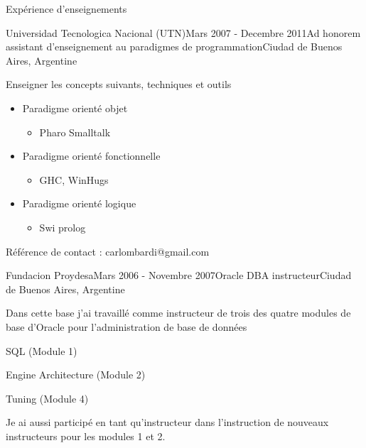 \documentclass{resume} %
\begin{document}
\begin{rSection}{Exp\'{e}rience d'enseignements}
\begin{rSubsection}{Universidad Tecnologica Nacional (UTN)}{Mars 2007 - Decembre 2011}{Ad honorem assistant d'enseignement au paradigmes de programmation}{Ciudad de Buenos Aires, Argentine}
\item Enseigner les concepts suivants, techniques et outils
\begin{itemize}
	\item Paradigme orient\'{e} objet
	\begin{itemize}
		\item Pharo Smalltalk
	\end{itemize}
	\item Paradigme orient\'{e} fonctionnelle
	\begin{itemize}
		\item GHC, WinHugs
	\end{itemize}
	\item Paradigme orient\'{e} logique
	\begin{itemize}
		\item  Swi prolog
	\end{itemize}
\end{itemize}
\item R\'{e}f\'{e}rence de contact : carlombardi@gmail.com
\end{rSubsection}


\begin{rSubsection}{Fundacion Proydesa}{Mars 2006 - Novembre 2007}{Oracle DBA instructeur}{Ciudad de Buenos Aires, Argentine}
	\item Dans cette base j'ai travaill\'{e} comme instructeur de trois des quatre modules de base d'Oracle pour l'administration de base de donn\'{e}es
	\item SQL (Module 1)
	\item Engine Architecture (Module 2)
	\item Tuning (Module 4)
	\item Je ai aussi particip\'{e} en tant qu'instructeur dans l'instruction de nouveaux instructeurs pour les modules 1 et 2.
\end{rSubsection}

\end{rSection}
\end{document}
